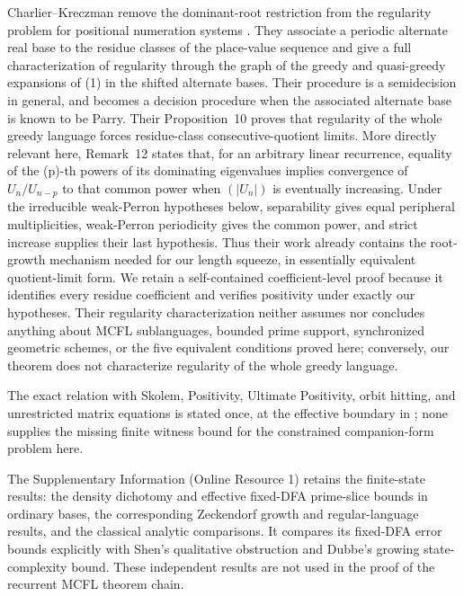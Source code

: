 Charlier--Kreczman remove the dominant-root restriction from the regularity
problem for positional numeration systems \cite{CharlierKreczman2025}.
They associate a periodic alternate real base to the residue classes of the
place-value sequence and give a full characterization of regularity through
the graph of the greedy and quasi-greedy expansions of (1) in the shifted
alternate bases. Their procedure is a semidecision in general, and becomes a
decision procedure when the associated alternate base is known to be Parry.
Their Proposition~10 proves that regularity of the whole greedy language
forces residue-class consecutive-quotient limits. More directly relevant
here, Remark~12 states that, for an arbitrary linear recurrence, equality of
the (p)-th powers of its dominating eigenvalues implies convergence of
\(U_n/U_{n-p}\) to that common power when \((\lvert U_n\rvert)\) is
eventually increasing. Under the irreducible weak-Perron hypotheses below,
separability gives equal peripheral multiplicities, weak-Perron periodicity
gives the common power, and strict increase supplies their last hypothesis.
Thus their work already contains the root-growth mechanism needed for our
length squeeze, in essentially equivalent quotient-limit form. We retain a
self-contained coefficient-level proof because it identifies every residue
coefficient and verifies positivity under exactly our hypotheses. Their
regularity characterization neither assumes nor concludes anything about
MCFL sublanguages, bounded prime support, synchronized geometric schemes, or
the five equivalent conditions proved here; conversely, our theorem does not
characterize regularity of the whole greedy language.

The exact relation with Skolem, Positivity, Ultimate Positivity, orbit
hitting, and unrestricted matrix equations is stated once, at the effective
boundary in ; none supplies the missing
finite witness bound for the constrained companion-form problem here.

The Supplementary Information (Online Resource 1) retains the finite-state results: the
density dichotomy and effective fixed-DFA prime-slice bounds in ordinary
bases, the corresponding Zeckendorf growth and regular-language results,
and the classical analytic comparisons. It compares its fixed-DFA error
bounds explicitly with Shen's qualitative obstruction and Dubbe's growing
state-complexity bound. These independent results are not used in the proof
of the recurrent MCFL theorem chain.

